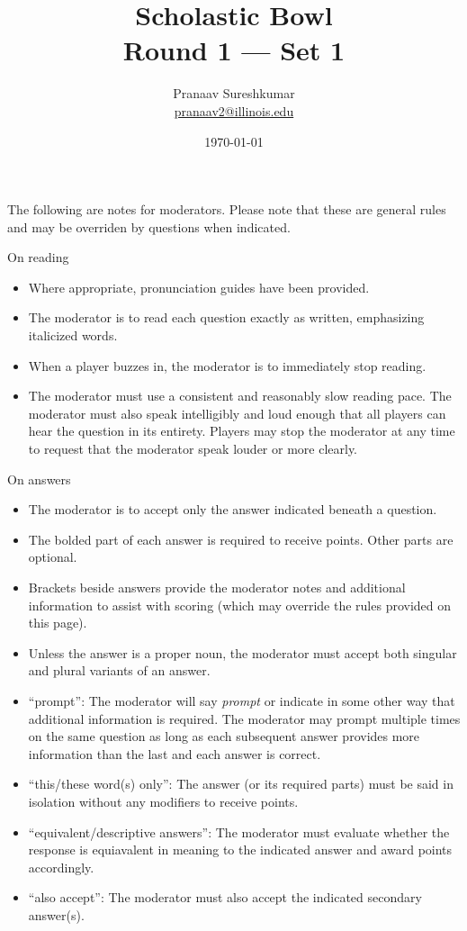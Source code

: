 \documentclass{report}
\title{\textbf{Scholastic Bowl} \\ Round 1 --- Set 1}
\author{Pranaav Sureshkumar \\ \href{mailto:pranaav2@illinois.edu}{pranaav2@illinois.edu}}
\date{\today}
\begin{document}
\thispagestyle{empty}
\maketitle

The following are notes for moderators. Please note that these are general rules and may be overriden by questions when indicated.

\vspace*{0.3 cm}
On reading
\begin{itemize}
    \item Where appropriate, pronunciation guides have been provided.
    \item The moderator is to read each question exactly as written, emphasizing italicized words.
    \item When a player buzzes in, the moderator is to immediately stop reading.
    \item The moderator must use a consistent and reasonably slow reading pace. The moderator must also speak intelligibly and loud enough that all players can hear the question in its entirety. Players may stop the moderator at any time to request that the moderator speak louder or more clearly.
\end{itemize}

\vspace*{0.3 cm}
On answers
\begin{itemize}
    \item The moderator is to accept only the answer indicated beneath a question.
    \item The bolded part of each answer is required to receive points. Other parts are optional.
    \item Brackets beside answers provide the moderator notes and additional information to assist with scoring (which may override the rules provided on this page).
    \item Unless the answer is a proper noun, the moderator must accept both singular and plural variants of an answer. 
    \item ``prompt'': The moderator will say \textit{prompt} or indicate in some other way that additional information is required. The moderator may prompt multiple times on the same question as long as each subsequent answer provides more information than the last and each answer is correct.
    \item ``this/these word(s) only'': The answer (or its required parts) must be said in isolation without any modifiers to receive points.
    \item ``equivalent/descriptive answers'': The moderator must evaluate whether the response is equiavalent in meaning to the indicated answer and award points accordingly.
    \item ``also accept'': The moderator must also accept the indicated secondary answer(s).
\end{itemize}
\end{document}
